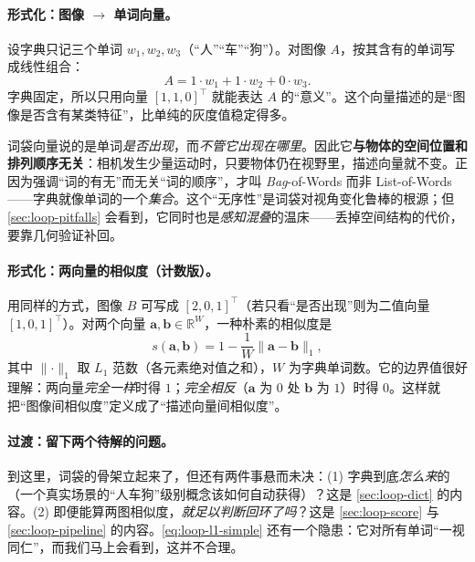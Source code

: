 \paragraph{形式化：图像 $\to$ 单词向量。}
设字典只记三个单词 $w_1,w_2,w_3$（“人”“车”“狗”）。对图像 $A$，按其含有的单词写成线性组合：
\begin{equation}
  A = 1\cdot w_1 + 1\cdot w_2 + 0\cdot w_3.
  \label{eq:loop-word-lincomb}
\end{equation}
字典固定，所以只用向量 $[1,1,0]^{\top}$ 就能表达 $A$ 的“意义”。这个向量描述的是“图像是否含有某类特征”，比单纯的灰度值稳定得多。

\begin{insight}\label{ins:loop-bag}
词袋向量说的是单词\emph{是否出现}，而\emph{不管它出现在哪里}\cite{gaoxiang2019slam14}。因此它\textbf{与物体的空间位置和排列顺序无关}：相机发生少量运动时，只要物体仍在视野里，描述向量就不变。正因为强调“词的有无”而无关“词的顺序”，才叫 \emph{Bag}-of-Words 而非 List-of-Words——字典就像单词的一个\emph{集合}。这个“无序性”是词袋对视角变化鲁棒的根源；但 \cref{sec:loop-pitfalls} 会看到，它同时也是\emph{感知混叠}的温床——丢掉空间结构的代价，要靠几何验证补回。
\end{insight}

\paragraph{形式化：两向量的相似度（计数版）。}
用同样的方式，图像 $B$ 可写成 $[2,0,1]^{\top}$（若只看“是否出现”则为二值向量 $[1,0,1]^{\top}$）。对两个向量 $\boldsymbol a,\boldsymbol b\in\mathbb{R}^{W}$，一种朴素的相似度是
\begin{equation}
  s(\boldsymbol a,\boldsymbol b)=1-\frac{1}{W}\lVert\boldsymbol a-\boldsymbol b\rVert_1,
  \label{eq:loop-l1-simple}
\end{equation}
其中 $\lVert\cdot\rVert_1$ 取 $L_1$ 范数（各元素绝对值之和），$W$ 为字典单词数。它的边界值很好理解\cite{gaoxiang2019slam14}：两向量\emph{完全一样}时得 $1$；\emph{完全相反}（$\boldsymbol a$ 为 $0$ 处 $\boldsymbol b$ 为 $1$）时得 $0$。这样就把“图像间相似度”定义成了“描述向量间相似度”。

\paragraph{过渡：留下两个待解的问题。}
到这里，词袋的骨架立起来了，但还有两件事悬而未决\cite{gaoxiang2019slam14}：(1) 字典到底\emph{怎么来}的（一个真实场景的“人车狗”级别概念该如何自动获得）？这是 \cref{sec:loop-dict} 的内容。(2) 即便能算两图相似度，\emph{就足以判断回环了吗}？这是 \cref{sec:loop-score} 与 \cref{sec:loop-pipeline} 的内容。\cref{eq:loop-l1-simple} 还有一个隐患：它对所有单词“一视同仁”，而我们马上会看到，这并不合理。

